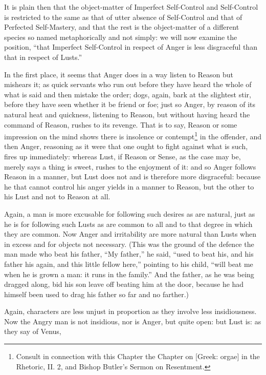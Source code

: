 
It is plain then that the object-matter of Imperfect Self-Control and
Self-Control is restricted to the same as that of utter absence of Self-Control
and that of Perfected Self-Mastery, and that the rest is the object-matter of a
different species so named metaphorically and not simply: we will now examine
the position, “that Imperfect Self-Control in respect of Anger is less
disgraceful than that in respect of Lusts.”

In the first place, it seems that Anger does in a way listen to Reason but
mishears it; as quick servants who run out before they have heard the whole of
what is said and then mistake the order; dogs, again, bark at the slightest
stir, before they have seen whether it be friend or foe; just so Anger, by
reason of its natural heat and quickness, listening to Reason, but without
having heard the command of Reason, rushes to its revenge. That is to say,
Reason or some impression on the mind shows there is insolence or
contempt\footnote{Consult in connection with this Chapter the Chapter on [Greek: orgae] in the
Rhetoric, II. 2, and Bishop Butler’s Sermon on Resentment.}
in the offender, and then Anger, reasoning as it were that one ought to fight
against what is such, fires up immediately: whereas Lust, if Reason or Sense,
as the case may be, merely says a thing is sweet, rushes to the enjoyment of
it: and so Anger follows Reason in a manner, but Lust does not and is therefore
more disgraceful: because he that cannot control his anger yields in a manner
to Reason, but the other to his Lust and not to Reason at all.

Again, a man is more excusable for following such desires as are natural, just
as he is for following such Lusts as are common to all and to that degree in
which they are common. Now Anger and irritability are more natural than Lusts
when in excess and for objects not necessary. (This was the ground of the
defence the man made who beat his father, “My father,” he said,
“used to beat his, and his father his again, and this little fellow
here,” pointing to his child, “will beat me when he is grown a man:
it runs in the family.” And the father, as he was being dragged along,
bid his son leave off beating him at the door, because he had himself been used
to drag his father so far and no farther.)

Again, characters are less unjust in proportion as they involve less
insidiousness. Now the Angry man is not insidious, nor is Anger, but quite
open: but Lust is: as they say of Venus,

